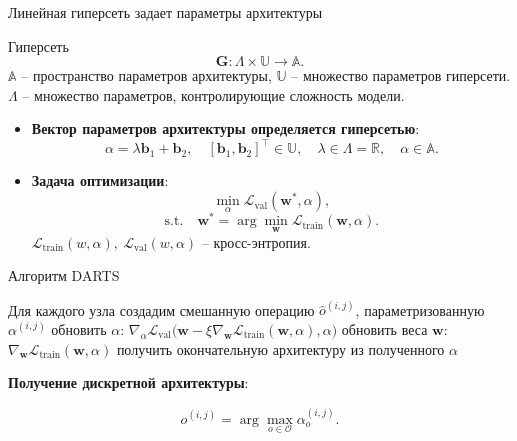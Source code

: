 \documentclass{beamer}
\begin{document}
\begin{frame}{Линейная гиперсеть задает параметры архитектуры}

\begin{block}{Гиперсеть}
$$\mathbf{G} : \Lambda \times \mathbb{U} \rightarrow \mathbb{A}.$$
$\mathbb{A}$ -- пространство параметров архитектуры, $\mathbb{U}$ -- множество параметров гиперсети. $\Lambda$ -- множество параметров, контролирующие сложность модели.
\end{block}

\begin{itemize}
\item \textbf{Вектор параметров архитектуры определяется гиперсетью}:
$$\alpha = \lambda\mathbf{b}_1 + \mathbf{b}_2, \quad [\mathbf{b}_1, \mathbf{b}_2]^\top \in \mathbb{U}, \quad \lambda \in \Lambda = \mathbb{R}, \quad \alpha \in \mathbb{A}.$$

\item \textbf{Задача оптимизации}:
$$\min_{\alpha}\mathcal{L}_\text{val}(\mathbf{w}^*, \alpha),$$ $$
 \mathrm{s.t.}\quad \mathbf{w}^* = \arg\min_{\mathbf{w}}\mathcal{L}_\text{train}(\mathbf{w}, \alpha).$$
$\mathcal{L}_\text{train}(w, \alpha), ~\mathcal{L}_\text{val}(w, \alpha)$ -- кросс-энтропия.
\end{itemize}



\end{frame}
\begin{frame}{Алгоритм DARTS}
 \begin{algorithm}[H]
\begin{algorithmic}[1]
\STATE Для каждого узла создадим смешанную операцию $\hat{o}^{(i, j)}$, параметризованную $\alpha^{(i, j)}$
\STATE  обновить $\alpha$: $\nabla_\alpha \mathcal{L}_\text{val}\bigl(\mathbf{w} - \xi\nabla_{\mathbf{w}}\mathcal{L}_\text{train}(\mathbf{w}, \alpha), \alpha\bigr)$
\STATE обновить веса $\mathbf{w}$: $\nabla_\mathbf{w}\mathcal{L}_\text{train}(\mathbf{w}, \alpha)$
\ENDWHILE
\STATE получить окончательную архитектуру из полученного $\alpha$
\end{algorithmic}
\end{algorithm}
\textbf{Получение дискретной архитектуры}:

$$o^{(i, j)} =\arg\max_{o\in\mathcal{O}}\alpha_o^{(i, j)}.$$


\end{frame}
\end{document}
